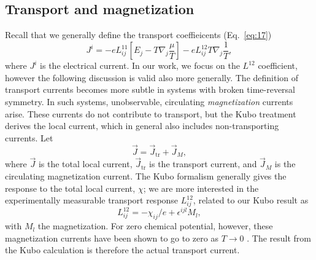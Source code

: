 \subsection{Transport and magnetization}
\label{sec:transport-magnetization}
Recall that we generally define the transport coeffieicents (Eq.~\eqref{eq:17})
\[
J^i = -e L_{ij}^{11} \left[
          E_j - T \nabla_j \frac{\mu}{T}
  \right] - e L^{12}_{ij} T \nabla_j \frac{1}{T},
\]
where \( J^i \) is the electrical current.
In our work, we focus on the \( L^{12} \) coefficient, however the following discussion is valid also more generally.
The definition of transport currents becomes more subtle in systems with broken time-reversal symmetry\cite{vanderwurffMagnetovorticalThermoelectricTransport2019, chernodubThermalTransportGeometry2021}.
In such systems, unobservable, circulating \emph{magnetization} currents arise.
These currents do not contribute to transport, but the Kubo treatment derives the local current, which in general also includes non-transporting currents.
Let
\begin{equation}
  \label{eq:23}
  \vec{J} = \vec{J}_{\text{tr}} + \vec{J}_M,
\end{equation}
where \( \vec{J} \) is the total local current, \( \vec{J}_{\text{tr}} \) is the transport current, and \( \vec{J}_M \) is the circulating magnetization current.
The Kubo formalism generally gives the response to the total local current, \( \chi \);
we are more interested in the experimentally measurable transport response \( L_{ij}^{12} \), related to our Kubo result as
\cite{chernodubThermalTransportGeometry2021}
\begin{equation}
  \label{eq:24}
  L^{12}_{ij} = -\chi_{ij} /e + \epsilon^{ijl} M_l,
\end{equation}
with \( M_l \) the magnetization.
For zero chemical potential, however, these magnetization currents have been shown to go to zero as \( T \to 0 \) \cite{vanderwurffMagnetovorticalThermoelectricTransport2019}.
The result from the Kubo calculation is therefore the actual transport current.


